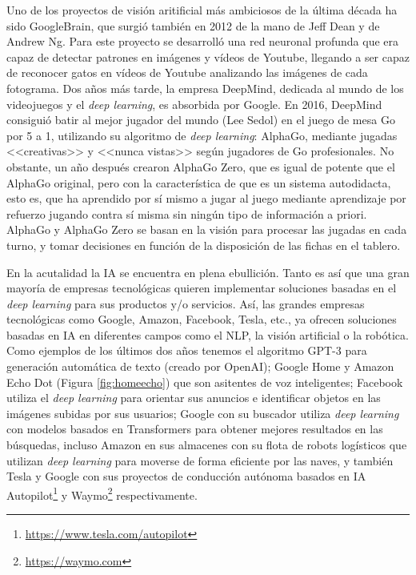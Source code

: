 Uno de los proyectos de visión aritificial más ambiciosos de la última década ha sido GoogleBrain, que surgió también en 2012 de la mano de Jeff Dean y de Andrew Ng. Para este proyecto se desarrolló una red neuronal profunda que era capaz de detectar patrones en imágenes y vídeos de Youtube, llegando a ser capaz de reconocer gatos en vídeos de Youtube analizando las imágenes de cada fotograma. Dos años más tarde, la empresa DeepMind, dedicada al mundo de los videojuegos y el \textit{deep learning}, es absorbida por Google. En 2016, DeepMind consiguió batir al mejor jugador del mundo (Lee Sedol) en el juego de mesa Go por 5 a 1, utilizando su algoritmo de \textit{deep learning}: AlphaGo, mediante jugadas <<creativas>> y <<nunca vistas>> según jugadores de Go profesionales. No obstante, un año después crearon AlphaGo Zero, que es igual de potente que el AlphaGo original, pero con la característica de que es un sistema autodidacta, esto es, que ha aprendido por sí mismo a jugar al juego mediante aprendizaje por refuerzo jugando contra sí misma sin ningún tipo de información a priori. AlphaGo y AlphaGo Zero se basan en la visión para procesar las jugadas en cada turno, y tomar decisiones en función de la disposición de las fichas en el tablero.

En la acutalidad la IA se encuentra en plena ebullición. Tanto es así que una gran mayoría de empresas tecnológicas quieren implementar soluciones basadas en el \textit{deep learning} para sus productos y/o servicios. Así, las grandes empresas tecnológicas como Google, Amazon, Facebook, Tesla, etc., ya ofrecen soluciones basadas en IA en diferentes campos como el NLP, la visión artificial o la robótica. Como ejemplos de los últimos dos años tenemos el algoritmo GPT-3 para generación automática de texto (creado por OpenAI); Google Home y Amazon Echo Dot (Figura \ref{fig:homeecho}) que son asitentes de voz inteligentes; Facebook utiliza el \textit{deep learning} para orientar sus anuncios e identificar objetos en las imágenes subidas por sus usuarios; Google con su buscador utiliza \textit{deep learning} con modelos basados en Transformers \cite{transformers} para obtener mejores resultados en las búsquedas, incluso Amazon en sus almacenes con su flota de robots logísticos que utilizan \textit{deep learning} para moverse de forma eficiente por las naves, y también Tesla y Google con sus proyectos de conducción autónoma basados en IA Autopilot\footnote{\url{https://www.tesla.com/autopilot}} y Waymo\footnote{\url{https://waymo.com}} respectivamente.

